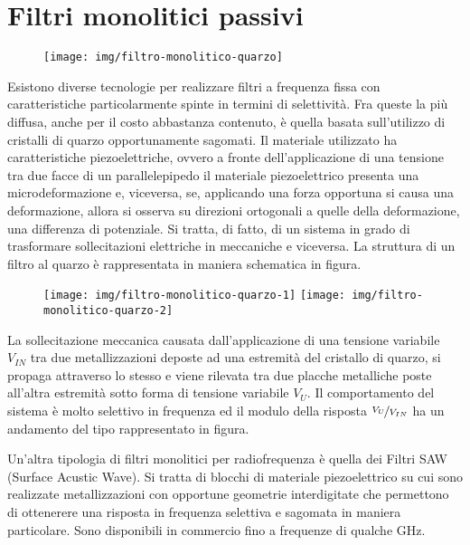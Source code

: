 \section{Filtri monolitici passivi}
\begin{figure}[hbt]
	\centering
	\texttt{[image: img/filtro-monolitico-quarzo]}
	\caption{}
	\label{fig:filtro-monolitico-quarzo}
\end{figure}
Esistono diverse tecnologie per realizzare filtri a frequenza fissa con caratteristiche particolarmente
spinte in termini di selettività. Fra queste la più diffusa, anche per il costo abbastanza contenuto, è
quella basata sull'utilizzo di cristalli di quarzo opportunamente sagomati. Il materiale utilizzato ha
caratteristiche piezoelettriche, ovvero a fronte dell'applicazione di una tensione tra due facce
di un parallelepipedo il materiale piezoelettrico presenta una microdeformazione e, viceversa, se,
applicando una forza opportuna si causa una deformazione, allora si osserva su direzioni ortogonali
a quelle della deformazione, una differenza di potenziale. Si tratta, di fatto, di un sistema in grado di
trasformare sollecitazioni elettriche in meccaniche e viceversa. La struttura di un filtro al quarzo è
rappresentata in maniera schematica in figura.


\begin{figure}[hbt]
	\centering
	\texttt{[image: img/filtro-monolitico-quarzo-1]}
	\hfill
	\texttt{[image: img/filtro-monolitico-quarzo-2]}
	\caption{}
	\label{fig:filtro-monolitico-quarzo-1}
\end{figure}

La sollecitazione meccanica causata dall'applicazione di
una tensione variabile $V_{IN}$ tra due metallizzazioni deposte ad una estremità del cristallo di quarzo, si propaga attraverso lo stesso e viene rilevata tra due placche metalliche poste all'altra estremità sotto forma di tensione variabile $V_U$.
Il comportamento del sistema è molto selettivo in frequenza
ed il modulo della risposta $\nicefrac{V_U}{V_{IN}}$ ha un andamento del tipo rappresentato in figura.



Un'altra tipologia di filtri monolitici per radiofrequenza è quella dei Filtri SAW (Surface Acustic Wave). Si tratta di blocchi di materiale piezoelettrico su cui sono realizzate metallizzazioni con opportune geometrie interdigitate che permettono di ottenerere una risposta in frequenza selettiva e sagomata in maniera particolare. Sono disponibili in commercio fino a frequenze di qualche GHz.

